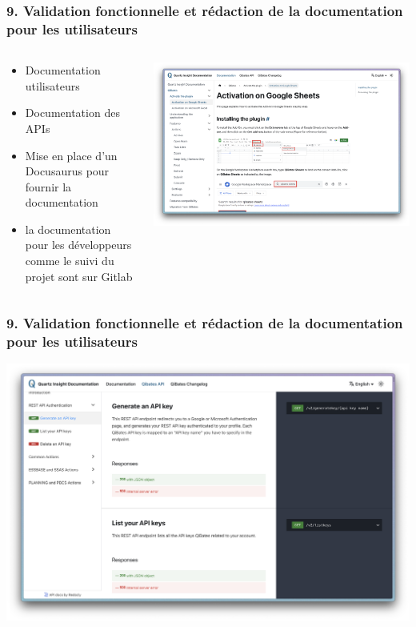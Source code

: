 \documentclass[aspectratio=169]{beamer}
\begin{document}
\begin{frame}
  \frametitle{9. Validation fonctionnelle et rédaction de la documentation pour les utilisateurs}
  \begin{columns}
    \begin{column}{0.5\textwidth}
      \begin{itemize}
        \item Documentation utilisateurs
        \item Documentation des APIs
        \item Mise en place d'un Docusaurus pour fournir la documentation
        \item la documentation pour les développeurs comme le suivi du projet
          sont sur Gitlab
      \end{itemize}
    \end{column}
    \begin{column}{0.5\textwidth}
      \includegraphics[height=0.60\textheight, center]{Imgs/doc-user.png}
    \end{column}
  \end{columns}
\end{frame}


\begin{frame}
  \frametitle{9. Validation fonctionnelle et rédaction de la documentation pour les utilisateurs}
  \includegraphics[height=0.80\textheight, center]{Imgs/full-doc.png}
\end{frame}
\end{document}

